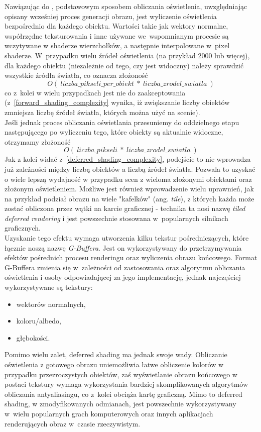 Nawiązując do \cite{forward_deferred}, podstawowym sposobem obliczania oświetlenia, uwzględniając opisany wcześniej proces generacji obrazu, jest wyliczenie oświetlenia bezpośrednio dla każdego obiektu. Wartości takie jak wektory normalne, współrzędne teksturowania i inne używane we~wspomnianym procesie są wczytywane w shaderze wierzchołków, a następnie interpolowane w~pixel shaderze. W~przypadku wielu źródeł oświetlenia (na przykład 2000 lub więcej), dla każdego obiektu (niezależnie od tego, czy jest widoczny) należy sprawdzić wszystkie źródła światła, co oznacza złożoność
\begin{equation}
\label{forward_shading_complexity}
O(~liczba\_pikseli\_per\_obiekt~*~liczba\_zrodel\_swiatla~)
\end{equation}
co z~kolei w wielu przypadkach jest nie do zaakceptowania (z~\ref{forward_shading_complexity} wynika, iż zwiększanie liczby obiektów zmniejsza liczbę źródeł światła, których można użyć na scenie).\\
Jeśli jednak proces obliczania oświetlania przesuniemy do oddzielnego etapu następującego po wyliczeniu tego, które obiekty są aktualnie widoczne, otrzymamy złożoność
\begin{equation}
\label{deferred_shading_complexity}
O(~liczba\_pikseli~*~liczba\_zrodel\_swiatla~)
\end{equation}
Jak z kolei widać z~\ref{deferred_shading_complexity}, podejście to nie wprowadza już zależności między liczbą obiektów a liczbą źródeł światła. Pozwala to uzyskać o wiele lepszą wydajność w przypadku scen z wieloma złożonymi obiektami oraz złożonym oświetleniem. Możliwe jest również wprowadzenie wielu uprawnień, jak na przykład podział obrazu na wiele "kafelków" (ang. \emph{tile}), z których każda może zostać obliczona przez wątki na karcie graficznej - technika ta nosi nazwę \emph{tiled deferred rendering} i jest powszechnie stosowana w~popularnych silnikach graficznych.\\
Uzyskanie tego efektu wymaga utworzenia kilku tekstur pośredniczących, które łącznie noszą nazwę \emph{G-Buffera}. Jest on wykorzystywany do przetrzymywania efektów pośrednich procesu renderingu oraz wyliczenia obrazu końcowego. Format G-Buffera zmienia się w~zależności od zastosowania oraz algorytmu obliczania oświetlenia i osoby odpowiadającej za jego implementację, jednak najczęściej wykorzystywane są tekstury:
\begin{itemize}
\item wektorów normalnych,
\item koloru/albedo,
\item głębokości.
\end{itemize}
Pomimo wielu zalet, deferred shading ma jednak swoje wady. Obliczanie oświetlenia z gotowego obrazu uniemożliwia łatwe obliczenie kolorów w przypadku przezroczystych obiektów, zaś wyświetlanie obrazu końcowego w postaci tekstury wymaga wykorzystania bardziej skomplikowanych algorytmów obliczania antyaliasingu, co z~kolei obciąża kartę graficzną. Mimo to deferred shading, w zmodyfikowanych odmianach, jest powszechnie wykorzystywany w~wielu popularnych grach komputerowych oraz innych aplikacjach renderujących obraz w~czasie rzeczywistym.

